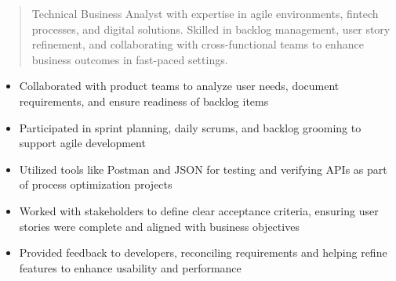 



\makecvheader

\begin{quote}
  \noindent
  Technical Business Analyst with expertise in agile environments, fintech processes, and digital solutions. Skilled in backlog management, user story refinement, and collaborating with cross-functional teams to enhance business outcomes in fast-paced settings.
\end{quote}

\par\smallskip
\noindent
\begin{minipage}{20cm}
  \begin{minipage}{9.75cm}
    \begin{itemize}
      \item Collaborated with product teams to analyze user needs, document requirements, and ensure readiness of backlog items
      \item Participated in sprint planning, daily scrums, and backlog grooming to support agile development
      \item Utilized tools like Postman and JSON for testing and verifying APIs as part of process optimization projects
    \end{itemize}
  \end{minipage}
  \hfill
  \begin{minipage}{9.75cm}
    \begin{itemize}
      \item Worked with stakeholders to define clear acceptance criteria, ensuring user stories were complete and aligned with business objectives
      \item Provided feedback to developers, reconciling requirements and helping refine features to enhance usability and performance
    \end{itemize}
  \end{minipage}
\end{minipage}
\par\smallskip
\divider


